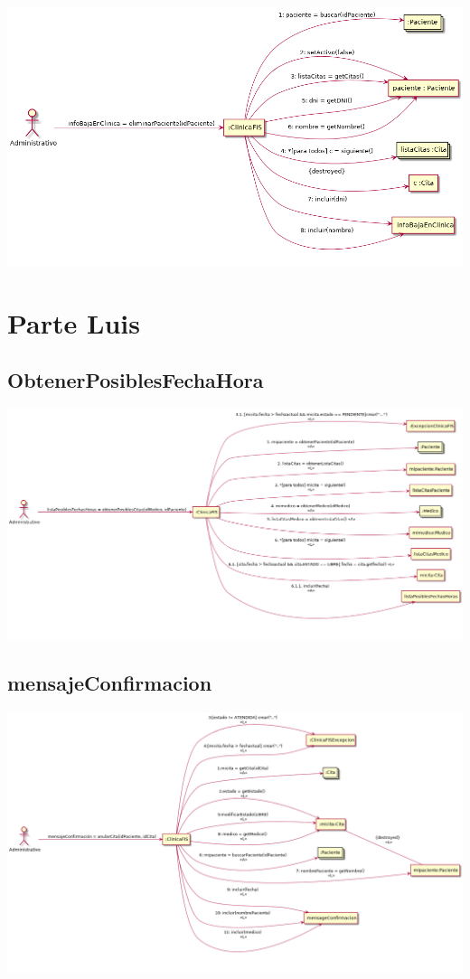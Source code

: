 \documentclass[10pt,a4paper,spanish]{report}
\begin{document}
\subsection*{}
\begin{center}
	\includegraphics[scale=0.35]{eliminarPaciente.png}
\end{center}

\section*{Parte Luis}
\subsection*{ObtenerPosiblesFechaHora}
\begin{center}
	\includegraphics[scale=0.33]{ObtenerPosiblesFechasHoras.png}
\end{center}
\subsection*{mensajeConfirmacion}
\begin{center}
	\includegraphics[scale=0.35]{anularCita.png}
\end{center}
\end{document}
